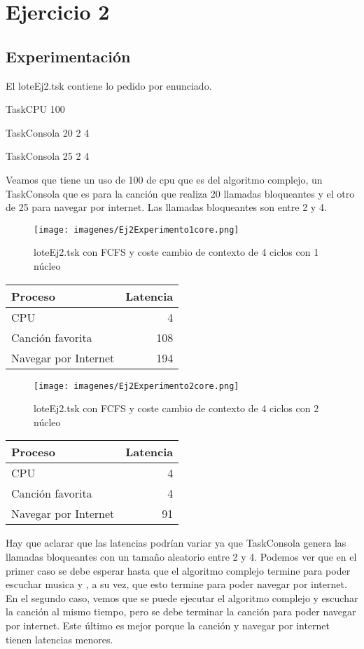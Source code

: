 
\section{Ejercicio 2}


\subsection{Experimentación}
El loteEj2.tsk contiene lo pedido por enunciado.

TaskCPU 100  

TaskConsola 20 2 4

TaskConsola 25 2 4

Veamos que tiene un uso de 100 de cpu que es del algoritmo complejo, un TaskConsola que es para la canción que realiza 20 llamadas bloqueantes y el otro de 25 para navegar por
internet. Las llamadas bloqueantes son entre 2 y 4.

\begin{figure}[H]
  \centering
    \texttt{[image: imagenes/Ej2Experimento1core.png]}
  \caption{loteEj2.tsk con FCFS y coste cambio de contexto de 4 ciclos con 1 núcleo}
\end{figure}

\begin{tabular}{l | r }
  Proceso & Latencia\\
  \hline
  CPU & 4\\
  Canción favorita & 108\\
  Navegar por Internet & 194\\
\end{tabular}

\begin{figure}[H]
  \centering
    \texttt{[image: imagenes/Ej2Experimento2core.png]}
  \caption{loteEj2.tsk con FCFS y coste cambio de contexto de 4 ciclos con 2 núcleo}
\end{figure}

\begin{tabular}{l | r }
  Proceso & Latencia\\
  \hline
  CPU & 4\\
  Canción favorita & 4\\
  Navegar por Internet & 91\\
\end{tabular}

Hay que aclarar que las latencias podrían variar ya que TaskConsola genera las llamadas bloqueantes con un tamaño aleatorio entre 2 y 4. Podemos ver que en el primer caso se
debe esperar hasta que el algoritmo complejo termine para poder escuchar musica y , a su vez, que esto termine para poder navegar por internet. En el segundo caso, vemos que 
se puede ejecutar el algoritmo complejo y escuchar la canción al mismo tiempo, pero se debe terminar la canción para poder navegar por internet. Este último es mejor porque
la canción y navegar por internet tienen latencias menores. 

